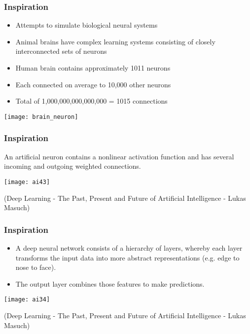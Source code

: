 \begin{frame}[fragile] \frametitle{Inspiration}

\begin{itemize}
\item Attempts to simulate biological neural systems
\item  Animal brains have complex learning systems consisting of closely interconnected sets of neurons
\item  Human brain contains approximately 1011 neurons
\item  Each connected on average to 10,000 other neurons
\item  Total of 1,000,000,000,000,000 = 1015 connections
\end{itemize}

\begin{center}
\texttt{[image: brain\_neuron]}
\end{center}

\end{frame}

\begin{frame}[fragile] \frametitle{Inspiration}
An artificial neuron contains a nonlinear activation function and has several
incoming and outgoing weighted connections. 
\begin{center}
\texttt{[image: ai43]}
\end{center}
{\tiny (Deep Learning - The Past, Present and Future of Artificial Intelligence - Lukas Masuch)}
\end{frame}



\begin{frame}[fragile] \frametitle{Inspiration}
\begin{itemize}
\item A deep neural network consists of a hierarchy of layers, whereby each layer
transforms the input data into more abstract representations (e.g. edge to
nose to face). 
\item The output layer combines those features to make predictions.
\end{itemize}
\begin{center}
\texttt{[image: ai34]}
\end{center}
{\tiny (Deep Learning - The Past, Present and Future of Artificial Intelligence - Lukas Masuch)}
\end{frame}

